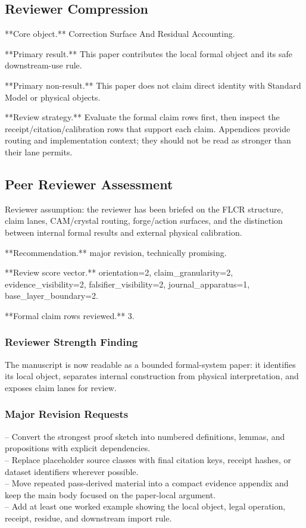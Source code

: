 \documentclass[11pt]{article}
\begin{document}
\subsection*{Reviewer Compression}

**Core object.** Correction Surface And Residual Accounting.

**Primary result.** This paper contributes the local formal object and its safe downstream-use rule.

**Primary non-result.** This paper does not claim direct identity with Standard Model or physical objects.

**Review strategy.** Evaluate the formal claim rows first, then inspect the receipt/citation/calibration rows that support each claim. Appendices provide routing and implementation context; they should not be read as stronger than their lane permits.

\subsection*{Peer Reviewer Assessment}

Reviewer assumption: the reviewer has been briefed on the FLCR structure, claim lanes, CAM/crystal routing, forge/action surfaces, and the distinction between internal formal results and external physical calibration.

**Recommendation.** major revision, technically promising.

**Review score vector.** orientation=2, claim\_granularity=2, evidence\_visibility=2, falsifier\_visibility=2, journal\_apparatus=1, base\_layer\_boundary=2.

**Formal claim rows reviewed.** 3.

\subsubsection*{Reviewer Strength Finding}

The manuscript is now readable as a bounded formal-system paper: it identifies its local object, separates internal construction from physical interpretation, and exposes claim lanes for review.

\subsubsection*{Major Revision Requests}

\noindent{}-- Convert the strongest proof sketch into numbered definitions, lemmas, and propositions with explicit dependencies.\\
\noindent{}-- Replace placeholder source classes with final citation keys, receipt hashes, or dataset identifiers wherever possible.\\
\noindent{}-- Move repeated pass-derived material into a compact evidence appendix and keep the main body focused on the paper-local argument.\\
\noindent{}-- Add at least one worked example showing the local object, legal operation, receipt, residue, and downstream import rule.\\
\end{document}
